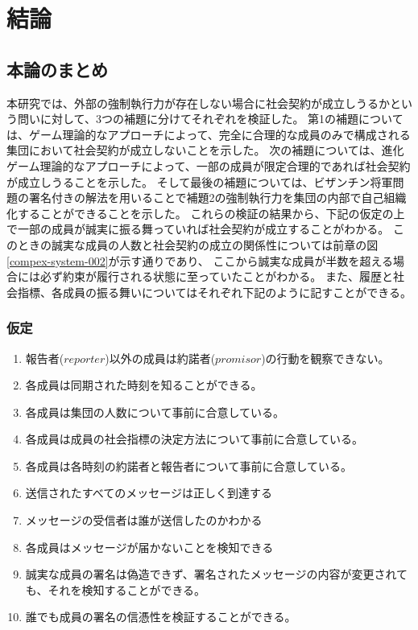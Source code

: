 \chapter{結論}
\section{本論のまとめ}
本研究では、外部の強制執行力が存在しない場合に社会契約が成立しうるかという問いに対して、3つの補題に分けてそれぞれを検証した。
第1の補題については、ゲーム理論的なアプローチによって、完全に合理的な成員のみで構成される集団において社会契約が成立しないことを示した。
次の補題については、進化ゲーム理論的なアプローチによって、一部の成員が限定合理的であれば社会契約が成立しうることを示した。
そして最後の補題については、ビザンチン将軍問題の署名付きの解法を用いることで補題2の強制執行力を集団の内部で自己組織化することができることを示した。
これらの検証の結果から、下記の仮定の上で一部の成員が誠実に振る舞っていれば社会契約が成立することがわかる。
このときの誠実な成員の人数と社会契約の成立の関係性については前章の図\ref{compex-system-002}が示す通りであり、
ここから誠実な成員が半数を超える場合には必ず約束が履行される状態に至っていたことがわかる。
また、履歴と社会指標、各成員の振る舞いについてはそれぞれ下記のように記すことができる。

\subsection{仮定}
\begin{enumerate}
  \item 報告者($reporter$)以外の成員は約諾者($promisor$)の行動を観察できない。  
  \item 各成員は同期された時刻を知ることができる。 
  \item 各成員は集団の人数について事前に合意している。
  \item 各成員は成員の社会指標の決定方法について事前に合意している。
  \item 各成員は各時刻の約諾者と報告者について事前に合意している。
  \item 送信されたすべてのメッセージは正しく到達する
  \item メッセージの受信者は誰が送信したのかわかる
  \item 各成員はメッセージが届かないことを検知できる
  \item 誠実な成員の署名は偽造できず、署名されたメッセージの内容が変更されても、それを検知することができる。
  \item 誰でも成員の署名の信憑性を検証することができる。
\end{enumerate}

